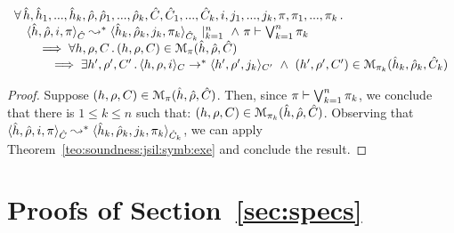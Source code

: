 \begin{cormax}
$$
\begin{array}{l}
\forall \, \sheap, \sheap_1, ..., \sheap_k, \sstore, \sstore_1, ..., \sstore_k, \sctx, \sctx_1, ..., \sctx_k, i, j_1, ..., j_k, \pc, \pc_1, ..., \pc_k \, . \,  \\
  \quad \symbtranstrans{\sheap, \sstore, i, \pc}{\sheap_k, \sstore_k, j_k, \pc_k}[\sctx][\sctx_k]\mid_{k = 1}^n
      \ \wedge \ \pc \vdash \bigvee_{k=1}^n \pc_k \\ 
      \quad \quad \implies 
         \forall \heap, \store, \ctx \, . \, (\heap, \store, \ctx) \in \smodels{\sheap, \sstore, \sctx}{\pc} \\
          \quad \qquad \implies \exists \heap', \store', \ctx' \, . \, 
                  \semtranstrans{\heap, \store, i}{\heap', \store', j_k}[\ctx][\ctx'] \ \wedge \ 
                  (\heap', \store', \ctx') \in \smodels{\sheap_k, \sstore_k, \sctx_k}{\pc_k}
\end{array}
$$
\end{cormax}
\begin{proof}
Suppose $(\heap, \store, \ctx) \in \smodels{\sheap, \sstore, \sctx}{\pc}$. Then, since $\pc \vdash \bigvee_{k=1}^n \pc_k$, 
we conclude that there is $1 \leq k \leq n$ such that:
 $(\heap, \store, \ctx) \in \smodels{\sheap, \sstore, \sctx}{\pc_k}$. 
 Observing that $\symbtranstrans{\sheap, \sstore, i, \pc}{\sheap_k, \sstore_k, j_k, \pc_k}[\sctx][\sctx_k]$, we can 
 apply Theorem~\ref{teo:soundness:jsil:symb:exe} and conclude the result. 
 \end{proof}
 
 \newpage
 
 
 
 
 
 
 
 \section{Proofs of Section~\ref{sec:specs}}
 

